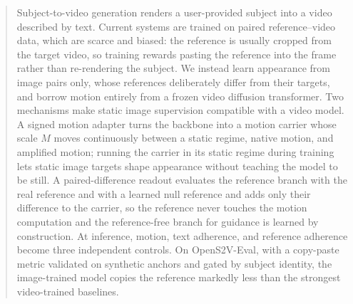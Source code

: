 \begin{abstract}
Subject-to-video generation renders a user-provided subject into a video described by text. Current systems are trained on paired reference--video data, which are scarce and biased: the reference is usually cropped from the target video, so training rewards pasting the reference into the frame rather than re-rendering the subject. We instead learn appearance from image pairs only, whose references deliberately differ from their targets, and borrow motion entirely from a frozen video diffusion transformer. Two mechanisms make static image supervision compatible with a video model. A signed motion adapter turns the backbone into a motion carrier whose scale $M$ moves continuously between a static regime, native motion, and amplified motion; running the carrier in its static regime during training lets static image targets shape appearance without teaching the model to be still. A paired-difference readout evaluates the reference branch with the real reference and with a learned null reference and adds only their difference to the carrier, so the reference never touches the motion computation and the reference-free branch for guidance is learned by construction. At inference, motion, text adherence, and reference adherence become three independent controls. On OpenS2V-Eval, with a copy-paste metric validated on synthetic anchors and gated by subject identity, the image-trained model copies the reference markedly less than the strongest video-trained baselines.
\end{abstract}
